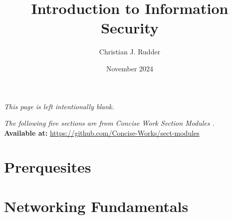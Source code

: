 \documentclass{memoir}
\title{Introduction to Information Security}
\author{Christian J. Rudder}
\date{November 2024}
\begin{document}
\maketitle
\setcounter{tocdepth}{2}

\tableofcontents

\newpage
\thispagestyle{empty}
\mbox{}
\vfill
\begin{center}
    \textit{This page is left intentionally blank.}
\end{center}
\vfill
\newpage
\thispagestyle{empty}
\mbox{}
\vfill
\begin{center}
    \textit{The following five sections are from Concise Work Section Modules \cite{concise_works_modules}.}\\
    \textbf{Available at:} \url{https://github.com/Concise-Works/sect-modules}
\end{center}
\vfill

\chapter{Prerquesites}

% 




\chapter{Networking Fundamentals}



\end{document}

